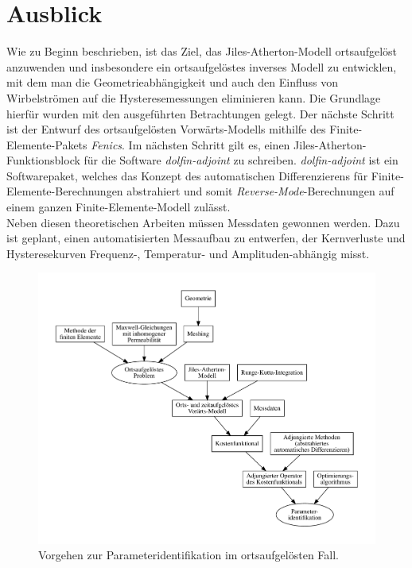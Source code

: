 \documentclass{scrartcl}
\begin{document}
\section{Ausblick}
Wie zu Beginn beschrieben, ist das Ziel, das Jiles-Atherton-Modell ortsaufgelöst anzuwenden und insbesondere ein ortsaufgelöstes inverses Modell zu entwicklen, mit dem man die Geometrieabhängigkeit und auch den Einfluss von Wirbelströmen auf die Hysteresemessungen eliminieren kann. Die Grundlage hierfür wurden mit den ausgeführten Betrachtungen gelegt. Der nächste Schritt ist der Entwurf des ortsaufgelösten Vorwärts-Modells mithilfe des Finite-Elemente-Pakets \emph{Fenics}. Im nächsten Schritt gilt es, einen Jiles-Atherton-Funktionsblock für die Software \emph{dolfin-adjoint} zu schreiben. \emph{dolfin-adjoint} ist ein Softwarepaket, welches das Konzept des automatischen Differenzierens für Finite-Elemente-Berechnungen abstrahiert und somit \emph{Reverse-Mode}-Berechnungen auf einem ganzen Finite-Elemente-Modell zulässt.\\
Neben diesen theoretischen Arbeiten müssen Messdaten gewonnen werden. Dazu ist geplant, einen automatisierten Messaufbau zu entwerfen, der Kernverluste und Hysteresekurven Frequenz-, Temperatur- und Amplituden-abhängig misst.
\appendix
\begin{figure}
\caption{Vorgehen zur Parameteridentifikation im ortsaufgelösten Fall.}
\label{fig:vorgehen_ort}

\includegraphics[width=\textwidth]{vorgehen_ort.pdf}

\end{figure}
\newpage
\printbibliography
\end{document}
